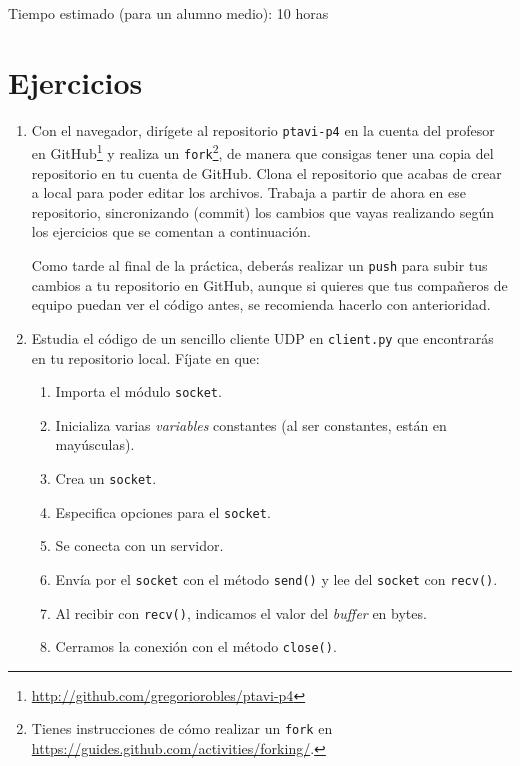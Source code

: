 \documentclass[11pt,a4paper]{article}
\begin{document}
Tiempo estimado (para un alumno medio): 10 horas

\section{Ejercicios}

\begin{enumerate}

  \item Con el navegador, dirígete al repositorio \texttt{ptavi-p4} en la cuenta del profesor en GitHub\footnote{\url{http://github.com/gregoriorobles/ptavi-p4}} y realiza un \texttt{fork}\footnote{Tienes instrucciones de cómo realizar un \texttt{fork} en \url{https://guides.github.com/activities/forking/}.}, de manera que consigas tener una copia del repositorio en tu cuenta de GitHub. Clona el repositorio que acabas de crear a local para poder editar los archivos. Trabaja a partir de ahora en ese repositorio, sincronizando (commit) los cambios que vayas realizando según los ejercicios que se comentan a continuación.

  Como tarde al final de la práctica, deberás realizar un \texttt{push} para subir tus cambios a tu repositorio en GitHub, aunque si quieres que tus compañeros de equipo puedan ver el código antes, se recomienda hacerlo con anterioridad.

  \item Estudia el código de un sencillo cliente UDP en \texttt{client.py} que encontrarás en tu repositorio local. Fíjate en que:
  \begin{enumerate}
    \item Importa el módulo \texttt{socket}.
    \item Inicializa varias \emph{variables} constantes (al ser constantes, están en mayúsculas).
    \item Crea un \texttt{socket}.
    \item Especifica opciones para el \texttt{socket}.
    \item Se conecta con un servidor.
    \item Envía por el \texttt{socket} con el método \texttt{send()} y lee del \texttt{socket} con \texttt{recv()}.
    \item Al recibir con \texttt{recv()}, indicamos el valor del \emph{buffer} en bytes.
    \item Cerramos la conexión con el método \texttt{close()}.
  \end{enumerate}



\end{enumerate}
\end{document}

